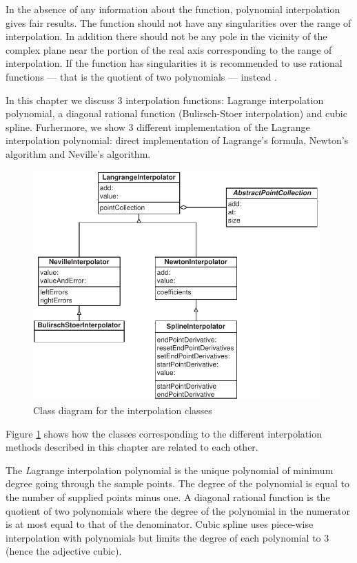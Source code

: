 In the absence of any information about the function, polynomial
interpolation gives fair results. The function should not have any
singularities over the range of interpolation. In addition there
should not be any pole in the vicinity of the complex plane near
the portion of the real axis corresponding to the range of
interpolation. If the function has singularities it is recommended
to use rational functions --- that is the quotient of two
polynomials --- instead \cite{Press}.

In this chapter we discuss 3 interpolation functions: Lagrange
interpolation polynomial, a diagonal rational function
(Bulirsch-Stoer interpolation) and cubic spline. Furhermore, we
show 3 different implementation of the Lagrange interpolation
polynomial: direct implementation of Lagrange's formula, Newton's
algorithm and Neville's algorithm.
\begin{figure}
\label{cls:interpolation}
\centering\includegraphics[width=11cm]{Figures/InterpolationClassDiagram}
\caption{Class diagram for the interpolation classes}
\end{figure}
Figure \ref{cls:interpolation} shows how the classes corresponding
to the different interpolation methods described in this chapter
are related to each other.

 The {\textit Lagrange interpolation polynomial}
is the unique polynomial of minimum degree going through the
sample points. The degree of the polynomial is equal to the number
of supplied points minus one. A diagonal rational function is the
quotient of two polynomials where the degree of the polynomial in
the numerator is at most equal to that of the denominator. Cubic
spline uses piece-wise interpolation with polynomials but limits
the degree of each polynomial to 3 (hence the adjective cubic).

